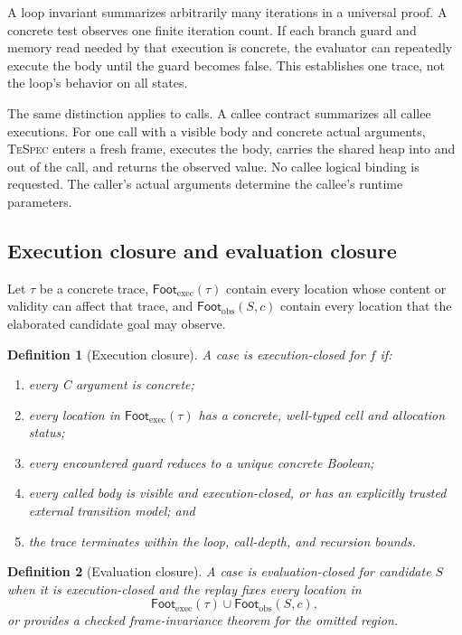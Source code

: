 \documentclass[10pt]{article}
\newtheorem{definition}{Definition}
\newcommand{\tespec}{\textsc{TeSpec}}
\begin{document}
A loop invariant summarizes arbitrarily many iterations in a universal proof.
A concrete test observes one finite iteration count.  If each branch guard and
memory read needed by that execution is concrete, the evaluator can repeatedly
execute the body until the guard becomes false.  This establishes one trace,
not the loop's behavior on all states.

The same distinction applies to calls.  A callee contract summarizes all
callee executions.  For one call with a visible body and concrete actual
arguments, \tespec{} enters a fresh frame, executes the body, carries the
shared heap into and out of the call, and returns the observed value.  No
callee logical binding is requested.  The caller's actual arguments determine
the callee's runtime parameters.

\subsection{Execution closure and evaluation closure}

Let $\tau$ be a concrete trace,
$\mathsf{Foot}_{\mathrm{exec}}(\tau)$ contain every location whose content or
validity can affect that trace, and $\mathsf{Foot}_{\mathrm{obs}}(S,c)$ contain
every location that the elaborated candidate goal may observe.

\begin{definition}[Execution closure]
A case is execution-closed for $f$ if:
\begin{enumerate}[leftmargin=1.4em]
  \item every C argument is concrete;
  \item every location in $\mathsf{Foot}_{\mathrm{exec}}(\tau)$ has a
        concrete, well-typed cell and allocation status;
  \item every encountered guard reduces to a unique concrete Boolean;
  \item every called body is visible and execution-closed, or has an
        explicitly trusted external transition model; and
  \item the trace terminates within the loop, call-depth, and recursion bounds.
\end{enumerate}
\end{definition}

\begin{definition}[Evaluation closure]
A case is evaluation-closed for candidate $S$ when it is execution-closed and
the replay fixes every location in
\[
  \mathsf{Foot}_{\mathrm{exec}}(\tau)
  \cup\mathsf{Foot}_{\mathrm{obs}}(S,c),
\]
or provides a checked frame-invariance theorem for the omitted region.
\end{definition}
\end{document}
